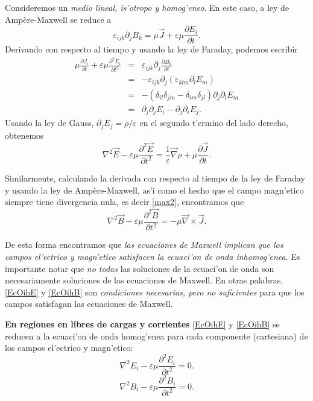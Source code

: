 Consideremos un \textit{medio lineal, is'otropo y homog'eneo}. En este caso, a ley de Amp\`ere-Maxwell se reduce a
\begin{equation}
\varepsilon_{ijk}\partial_jB_k=\mu\vec{J}+\varepsilon\mu\frac{\partial E_i}{\partial t}.
\end{equation}
Derivando con respecto al tiempo y usando la ley de Faraday, podemos escribir
\begin{eqnarray}
\mu \frac{\partial J_i}{\partial t}+\varepsilon\mu\frac{\partial^2E_i}{\partial t^2}
&=&\varepsilon_{ijk}\partial_j\frac {\partial B_k}{\partial t} \\
&=&-\varepsilon_{ijk}\partial_j\left(\varepsilon_{klm}\partial_lE_m \right)\\
&=&-\left( \delta_{il}\delta_{jm}-\delta_{im}\delta_{jl}\right)
\partial_j\partial_lE_m\\
&=&\partial_j\partial_jE_i-\partial_j\partial_iE_j.
\end{eqnarray}
Usando la ley de Gauss, $\partial_jE_j=\rho/\varepsilon$ en el segundo t'ermino del lado derecho, obtenemos
\begin{equation}\label{EcOihE}
\boxed{\nabla^2\vec{E}-\varepsilon\mu\frac{\partial^2\vec{E}}{\partial t^2}=\frac{1}{\varepsilon}\vec\nabla\rho+\mu\frac{\partial\vec{J}}{\partial t}.}
\end{equation}

Similarmente, calculando la derivada con respecto al tiempo de la ley de Faraday y usando la ley de Amp\`ere-Maxwell, as'i como el hecho que el campo magn'etico siempre tiene divergencia nula, es decir \eqref{max2}, encontramos que
\begin{equation}\label{EcOihB}
\boxed{\nabla^2\vec{B}-\varepsilon\mu\frac{\partial^2\vec{B}}{\partial t^2}=-\mu\vec\nabla\times\vec{J}.}
\end{equation}

De esta forma encontramos que \textit{las ecuaciones de Maxwell implican que los
campos el'ectrico y magn'etico satisfacen la ecuaci'on de onda inhomog'enea}. Es importante notar que \textit{no todas} las soluciones de la ecuaci'on de onda son necesariamente soluciones de las ecuaciones de Maxwell. En otras palabras, \eqref{EcOihE} y \eqref{EcOihB} son \textit{condiciones necesarias, pero no suficientes} para que los campos satisfagan las ecuaciones de Maxwell.

\textbf{En regiones en libres de cargas y corrientes} \eqref{EcOihE} y \eqref{EcOihB} se reducen a la ecuaci'on de onda homog'enea para cada componente (cartesiana) de los campos el'ectrico y magn'etico:
\begin{equation}\label{econdaE}
\boxed{\nabla^2E_i-\varepsilon\mu\frac{\partial^2E_i}{\partial t^2}=0.}
\end{equation}
\begin{equation}
\boxed{\nabla^2B_i-\varepsilon\mu\frac{\partial^2B_i}{\partial t^2}=0.}
\label{econdaB}
\end{equation}



